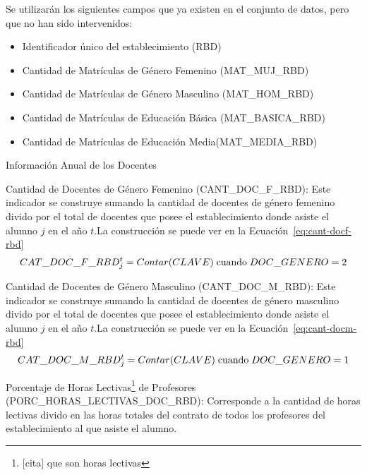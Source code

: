 \begin{longdescription}
\begin{longdescription}
            \end{longdescription} 
            Se utilizarán los siguientes campos que ya existen en el conjunto de datos, pero que no han sido intervenidos:
            \begin{itemize}
              \item Identificador único del establecimiento (RBD)
              \item Cantidad de Matrículas de Género Femenino (MAT\_MUJ\_RBD)
              \item Cantidad de Matrículas de Género Masculino (MAT\_HOM\_RBD)
              \item Cantidad de Matrículas de Educación Básica (MAT\_BASICA\_RBD)
              \item Cantidad de Matrículas de Educación Media(MAT\_MEDIA\_RBD)
            \end{itemize}
            \item[Información Anual de los Docentes] \hfill \\
            \begin{longdescription}
                \item[Cantidad de Docentes de Género Femenino]
                (CANT\_DOC\_F\_RBD):
                Este indicador se construye sumando la cantidad de docentes de género femenino divido por el total de docentes que posee el establecimiento donde asiste el alumno $j$ en el año $t$.La construcción se puede ver en la Ecuación~\ref{eq:cant-docf-rbd}
              \begin{equation}
              \centering
                CAT\_DOC\_F\_RBD_{j}^{t} = Contar(CLAVE) \; \mbox{cuando} \; DOC\_GENERO = 2
                \label{eq:cant-docf-rbd}
              \end{equation}
                \item[Cantidad de Docentes de Género Masculino]
                (CANT\_DOC\_M\_RBD):
                 Este indicador se construye sumando la cantidad de docentes de género masculino divido por el total de docentes que posee el establecimiento donde asiste el alumno $j$ en el año $t$.La construcción se puede ver en la Ecuación~\ref{eq:cant-docm-rbd}
                  \begin{equation}
                  \centering
                    CAT\_DOC\_M\_RBD_{j}^{t} = Contar(CLAVE) \; \mbox{cuando} \; DOC\_GENERO = 1
                    \label{eq:cant-docm-rbd}
                  \end{equation}
                \item[Porcentaje de Horas Lectivas\footnote{[cita] que son horas lectivas} de Profesores](PORC\_HORAS\_LECTIVAS\_DOC\_RBD): Corresponde a la cantidad de horas lectivas divido en las horas totales del contrato de todos los profesores del establecimiento al que asiste el alumno.
                

\end{longdescription}
\end{longdescription}
